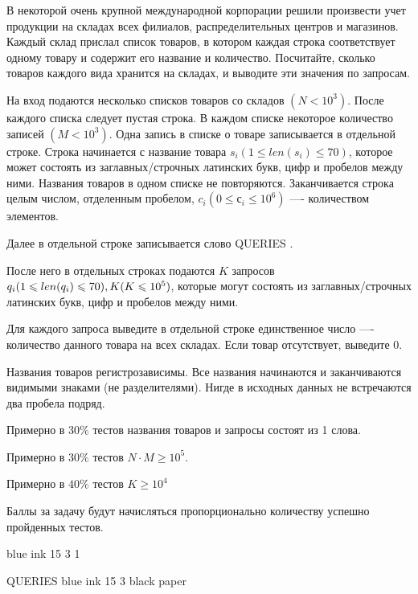 
В некоторой очень крупной международной корпорации решили произвести учет продукции на складах всех филиалов, распределительных центров и магазинов. Каждый склад прислал список товаров, в котором каждая строка соответствует одному товару и содержит его название и количество. Посчитайте, сколько товаров каждого вида хранится на складах, и выводите эти значения по запросам.


На вход подаются несколько списков товаров со складов $ (N \lt  10^3) $. После каждого списка следует пустая строка. В каждом списке некоторое количество записей $(M \lt 10^3)$. Одна запись в списке о товаре записывается в отдельной строке. Строка начинается с название товара $ s_i (1 \leq len(s_i) \leq 70) $, которое может состоять из заглавных/строчных латинских букв, цифр и пробелов между ними. Названия товаров в одном списке не повторяются. Заканчивается строка целым числом, отделенным пробелом, $ c_i (0 \leq с_i \leq 10^6) $ —- количеством элементов. 

Далее в отдельной строке записывается слово QUERIES .

После него в отдельных строках подаются $ K $ запросов $  q_i\space (1 \leq len(q_i) \leq 70), K\space (K \leq 10^5 )$, которые могут состоять из заглавных/строчных латинских букв, цифр и пробелов между ними. 

\outputfmtSection

Для каждого запроса выведите в отдельной строке единственное число —- количество данного товара на всех складах. Если товар отсутствует, выведите $ 0 $.

\explanationSection

Названия товаров регистрозависимы. Все названия начинаются и заканчиваются видимыми знаками (не разделителями). Нигде в исходных данных не встречаются два пробела подряд.

\markSection

Примерно в $ 30\% $ тестов названия товаров и запросы состоят из 1 слова. 

Примерно в $ 30\% $ тестов $  N \cdot M \geq 10 ^ 5 $.

Примерно в $ 40\% $ тестов $ K \geq 10^4 $

Баллы за задачу будут начисляться пропорционально количеству успешно пройденных тестов.


\begin{myverbbox}[\small]{\vinput}
    blue ink 15 3 1

    QUERIES
    blue ink 15 3
    black paper
\end{myverbbox}

